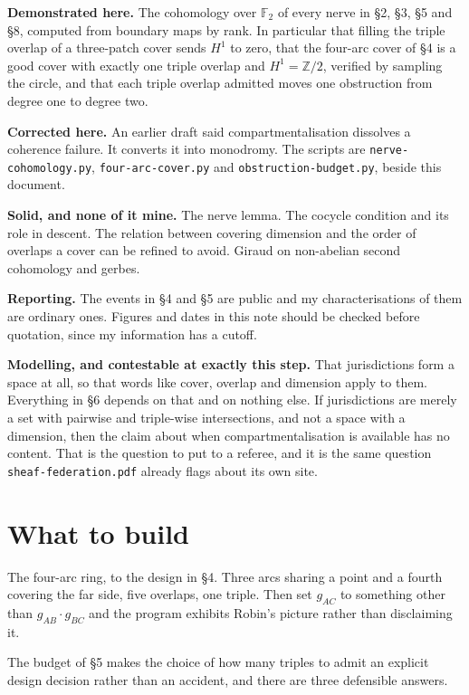 \documentclass[11pt,a4paper]{article}
\begin{document}
\begin{alarmbox}
\textbf{Demonstrated here.} The cohomology over $\mathbb{F}_2$ of every nerve
in \S2, \S3, \S5 and \S8, computed from boundary maps by rank. In particular
that filling the triple overlap of a three-patch cover sends $H^1$ to zero,
that the four-arc cover of \S4 is a good cover with exactly one triple overlap
and $H^1 = \mathbb{Z}/2$, verified by sampling the circle, and that each triple
overlap admitted moves one obstruction from degree one to degree two.

\textbf{Corrected here.} An earlier draft said compartmentalisation dissolves a
coherence failure. It converts it into monodromy. The scripts are
\texttt{nerve-cohomology.py}, \texttt{four-arc-cover.py} and
\texttt{obstruction-budget.py}, beside this document.

\textbf{Solid, and none of it mine.} The nerve lemma. The cocycle condition and
its role in descent. The relation between covering dimension and the order of
overlaps a cover can be refined to avoid. Giraud on non-abelian second
cohomology and gerbes.

\textbf{Reporting.} The events in \S4 and \S5 are public and my
characterisations of them are ordinary ones. Figures and dates in this note
should be checked before quotation, since my information has a cutoff.

\textbf{Modelling, and contestable at exactly this step.} That jurisdictions
form a space at all, so that words like cover, overlap and dimension apply to
them. Everything in \S6 depends on that and on nothing else. If jurisdictions
are merely a set with pairwise and triple-wise intersections, and not a space
with a dimension, then the claim about when compartmentalisation is available
has no content. That is the question to put to a referee, and it is the same
question \texttt{sheaf-federation.pdf} already flags about its own site.
\end{alarmbox}

\section{What to build}

The four-arc ring, to the design in \S4. Three arcs sharing a point and a
fourth covering the far side, five overlaps, one triple. Then set $g_{AC}$ to
something other than $g_{AB} \cdot g_{BC}$ and the program exhibits Robin's
picture rather than disclaiming it.

The budget of \S5 makes the choice of how many triples to admit an explicit
design decision rather than an accident, and there are three defensible answers.
\end{document}
